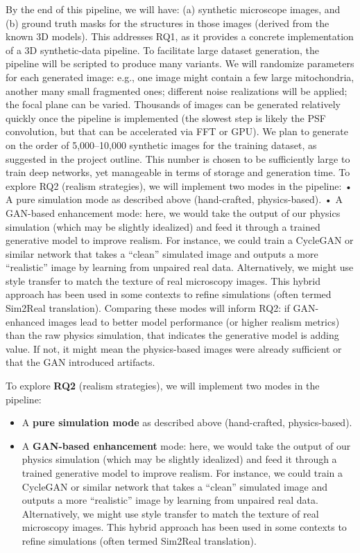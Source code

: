 \documentclass[
oneside,      %
openany       %
]{imc-inf}
\begin{document}
	By the end of this pipeline, we will have: (a) synthetic microscope images, and (b) ground truth masks for the structures in those images (derived from the known 3D models). This addresses RQ1, as it provides a concrete implementation of a 3D synthetic-data pipeline.
	To facilitate large dataset generation, the pipeline will be scripted to produce many variants. We will randomize parameters for each generated image: e.g., one image might contain a few large mitochondria, another many small fragmented ones; different noise realizations will be applied; the focal plane can be varied. Thousands of images can be generated relatively quickly once the pipeline is implemented (the slowest step is likely the PSF convolution, but that can be accelerated via FFT or GPU). We plan to generate on the order of 5,000–10,000 synthetic images for the training dataset, as suggested in the project outline. This number is chosen to be sufficiently large to train deep networks, yet manageable in terms of storage and generation time.
	To explore RQ2 (realism strategies), we will implement two modes in the pipeline:
	•	A pure simulation mode as described above (hand-crafted, physics-based).
	•	A GAN-based enhancement mode: here, we would take the output of our physics simulation (which may be slightly idealized) and feed it through a trained generative model to improve realism. For instance, we could train a CycleGAN or similar network that takes a “clean” simulated image and outputs a more “realistic” image by learning from unpaired real data. Alternatively, we might use style transfer to match the texture of real microscopy images. This hybrid approach has been used in some contexts to refine simulations (often termed Sim2Real translation).
	Comparing these modes will inform RQ2: if GAN-enhanced images lead to better model performance (or higher realism metrics) than the raw physics simulation, that indicates the generative model is adding value. If not, it might mean the physics-based images were already sufficient or that the GAN introduced artifacts.
	
	\vspace{1.5em}
	To explore \textbf{RQ2} (realism strategies), we will implement two modes in the pipeline:
	
	\begin{itemize}
		\item A \textbf{pure simulation mode} as described above (hand-crafted, physics-based).
		
		\item A \textbf{GAN-based enhancement} mode: here, we would take the output of our physics simulation (which may be slightly idealized) and feed it through a trained generative model to improve realism. For instance, we could train a CycleGAN or similar network that takes a “clean” simulated image and outputs a more “realistic” image by learning from unpaired real data. Alternatively, we might use style transfer to match the texture of real microscopy images. This hybrid approach has been used in some contexts to refine simulations (often termed Sim2Real translation).
	\end{itemize}
	
\end{document}
